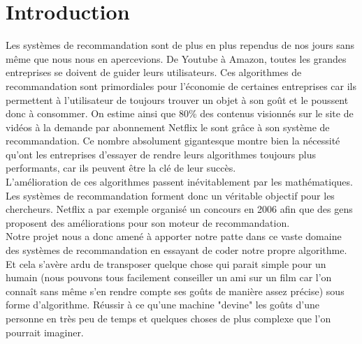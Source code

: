 \documentclass[light]{ceri}
\begin{document}
\section{Introduction}
Les systèmes de recommandation sont de plus en plus rependus de nos jours sans même que nous nous en apercevions. De Youtube à Amazon, toutes les grandes entreprises se doivent de guider leurs utilisateurs. Ces algorithmes de recommandation sont primordiales pour l'économie de certaines entreprises car ils permettent à l'utilisateur de toujours trouver un objet à son goût et le poussent donc à consommer. On estime ainsi que 80\% des contenus visionnés sur le site de vidéos à la demande par abonnement Netflix le sont grâce à son système de recommandation. Ce nombre absolument gigantesque montre bien la nécessité qu'ont les entreprises d'essayer de rendre leurs algorithmes toujours plus performants, car ils peuvent être la clé de leur succès.\\
\indent L'amélioration de ces algorithmes passent inévitablement par les mathématiques. Les systèmes de recommandation forment donc un véritable objectif pour les chercheurs. Netflix a par exemple organisé un concours en 2006 afin que des gens proposent des améliorations pour son moteur de recommandation.\\
\indent Notre projet nous a donc amené à apporter notre patte dans ce vaste domaine des systèmes de recommandation en essayant de coder notre propre algorithme. Et cela s'avère ardu de transposer quelque chose qui parait simple pour un humain (nous pouvons tous facilement conseiller un ami sur un film car l'on connaît sans même s'en rendre compte ses goûts de manière assez précise) sous forme d'algorithme. Réussir à ce qu'une machine "devine" les goûts d'une personne en très peu de temps et quelques choses de plus complexe que l'on pourrait imaginer.  

\end{document}
